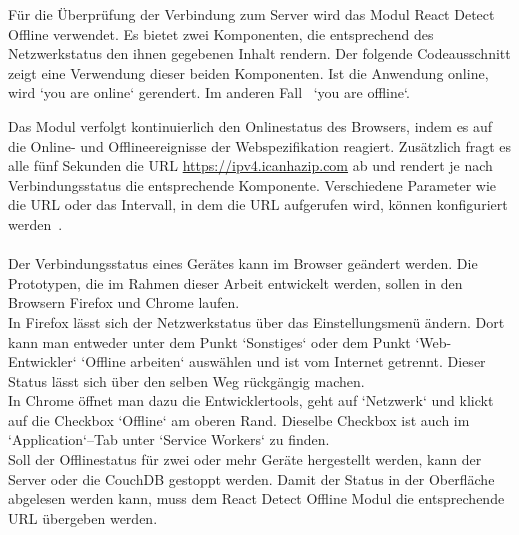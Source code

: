 Für die Überprüfung der Verbindung zum Server wird das Modul React Detect Offline verwendet.
Es bietet zwei Komponenten, die entsprechend des Netzwerkstatus den ihnen gegebenen Inhalt rendern.
Der folgende Codeausschnitt zeigt eine Verwendung dieser beiden Komponenten. Ist die Anwendung online, wird `you are online` gerendert. Im anderen Fall ~`you are offline`.
%
\begin{center}

\end{center}
%
Das Modul verfolgt kontinuierlich den Onlinestatus des Browsers, indem es auf die Online- und Offlineereignisse der Webspezifikation reagiert. Zusätzlich fragt es alle fünf Sekunden die URL \url{https://ipv4.icanhazip.com} ab und rendert je nach Verbindungsstatus die entsprechende Komponente.
Verschiedene Parameter wie die URL oder das Intervall, in dem die URL aufgerufen wird, können konfiguriert werden~\cite{react-detect}. \\\\
%
Der Verbindungsstatus eines Gerätes kann im Browser geändert werden. Die Prototypen, die im Rahmen dieser Arbeit entwickelt werden, sollen in den Browsern Firefox und Chrome laufen.\\
In Firefox lässt sich der Netzwerkstatus über das Einstellungsmenü ändern. Dort kann man entweder unter dem Punkt `Sonstiges` oder dem Punkt `Web-Entwickler` `Offline arbeiten` auswählen und ist vom Internet getrennt. Dieser Status lässt sich über den selben Weg rückgängig machen.\\
In Chrome öffnet man dazu die Entwicklertools, geht auf `Netzwerk` und klickt auf die Checkbox `Offline` am oberen Rand. Dieselbe Checkbox ist auch im `Application`--Tab unter `Service Workers` zu finden.\\
Soll der Offlinestatus für zwei oder mehr Geräte hergestellt werden, kann der Server oder die CouchDB gestoppt werden. Damit der Status in der Oberfläche abgelesen werden kann, muss dem React Detect Offline Modul die entsprechende URL übergeben werden.
